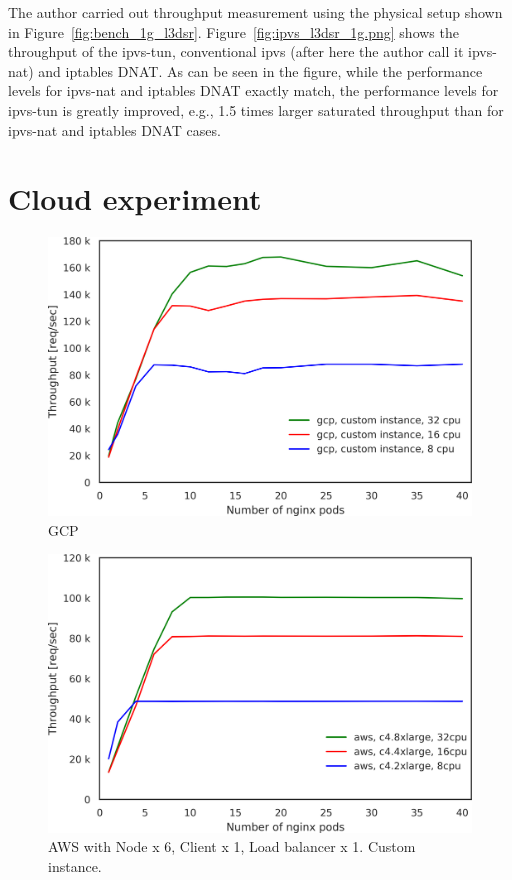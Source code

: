 The author carried out throughput measurement using the physical setup shown in Figure~\ref{fig:bench_1g_l3dsr}.
Figure~\ref{fig:ipvs_l3dsr_1g.png} shows the throughput of the ipvs-tun, conventional ipvs (after here the author call it ipvs-nat) and iptables DNAT.
As can be seen in the figure, while the performance levels for ipvs-nat and iptables DNAT exactly match, the performance levels for ipvs-tun is greatly improved, e.g., 1.5 times larger saturated throughput than for ipvs-nat and iptables DNAT cases.

\FloatBarrier

\section{Cloud experiment
}

\begin{figure}[t]
  \centering
  \includegraphics[width=0.8\columnwidth]{Figs/gcp_all_tp}
  \caption{GCP}
  \label{fig:gcp_all_ieice}
\end{figure}

\begin{figure}[t]
  \centering
  \includegraphics[width=0.8\columnwidth]{Figs/aws_c4_tp}
  \caption{AWS with Node x 6, Client x 1, Load balancer x 1. Custom instance. }
  \label{fig:aws_c4_ieice}
\end{figure}

